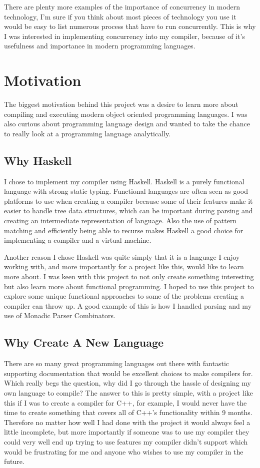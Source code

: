 There are plenty more examples of the importance of concurrency in modern technology, I'm sure if you think about most pieces of technology you use it would be easy to list numerous process that have to run concurrently. This is why I was interested in implementing concurrency into my compiler, because of it's usefulness and importance in modern programming languages.   


\section{Motivation}

The biggest motivation behind this project was a desire to learn more about compiling and executing modern object oriented programming languages. I was also curious about programming language design and wanted to take the chance to really look at a programming language analytically.

\subsection{Why Haskell}

I chose to implement my compiler using Haskell. Haskell is a purely functional language with strong static typing. Functional languages are often seen as good platforms to use when creating a compiler because some of their features make it easier to handle tree data structures, which can be important during parsing and creating an intermediate representation of language. Also the use of pattern matching and efficiently being able to recurse makes Haskell a good choice for implementing a compiler and a virtual machine.

Another reason I chose Haskell was quite simply that it is a language I enjoy working with, and more importantly for a project like this, would like to learn more about. I was keen with this project to not only create something interesting but also learn more about functional programming. I hoped to use this project to explore some  unique functional approaches to some of the problems creating a compiler can throw up. A good example of this is how I handled parsing and my use of Monadic Parser Combinators.

\subsection{Why Create A New Language}

There are so many great programming languages out there with fantastic supporting documentation that would be excellent choices to make compilers for. Which really begs the question, why did I go through the hassle of designing my own language to compile? The answer to this is pretty simple, with a project like this if I was to create a compiler for C++, for example, I would never have the time to create something that covers all of C++'s functionality within 9 months. Therefore no matter how well I had done with the project it would always feel a little incomplete, but more importantly if someone was to use my compiler they could very well end up trying to use features my compiler didn't support which would be frustrating for me and anyone who wishes to use my compiler in the future.

